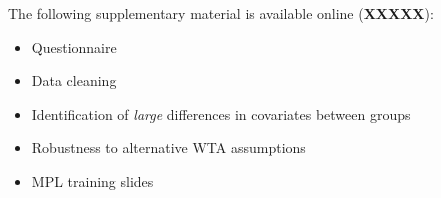 The following supplementary material is available online (\textbf{XXXXX}):

\begin{itemize}
  \item Questionnaire

  \item Data cleaning

  \item Identification of \emph{large} differences in covariates between groups

  \item Robustness to alternative WTA assumptions

  \item MPL training slides  
\end{itemize}
